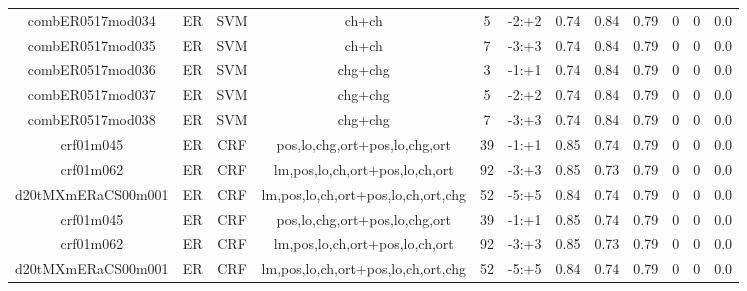 \documentclass[a4paper]{article}
\begin{document}
\begin{landscape}
\begin{center}
\begin{tabular}{ |c|c|c|c|c|c|c|c|c|c|c|c|}
 
 	
 	\small{ combER0517mod034 } & ER & SVM & ch+ch  &  5 &  -2:+2  &  0.74 & 0.84 & 0.79  &  0 & 0 & 0.0 \\
 	

 
 	
 	\small{ combER0517mod035 } & ER & SVM & ch+ch  &  7 &  -3:+3  &  0.74 & 0.84 & 0.79  &  0 & 0 & 0.0 \\
 	

 
 	
 	\small{ combER0517mod036 } & ER & SVM & chg+chg  &  3 &  -1:+1  &  0.74 & 0.84 & 0.79  &  0 & 0 & 0.0 \\
 	

 
 	
 	\small{ combER0517mod037 } & ER & SVM & chg+chg  &  5 &  -2:+2  &  0.74 & 0.84 & 0.79  &  0 & 0 & 0.0 \\
 	

 
 	
 	\small{ combER0517mod038 } & ER & SVM & chg+chg  &  7 &  -3:+3  &  0.74 & 0.84 & 0.79  &  0 & 0 & 0.0 \\
 	

 
 	
 	\small{ crf01m045 } & ER & CRF & pos,lo,chg,ort+pos,lo,chg,ort  &  39 &  -1:+1  &  0.85 & 0.74 & 0.79  &  0 & 0 & 0.0 \\
 	

 
 	
 	\small{ crf01m062 } & ER & CRF & lm,pos,lo,ch,ort+pos,lo,ch,ort  &  92 &  -3:+3  &  0.85 & 0.73 & 0.79  &  0 & 0 & 0.0 \\
 	

 
 	
 	\small{ d20tMXmERaCS00m001 } & ER & CRF & lm,pos,lo,ch,ort+pos,lo,ch,ort,chg  &  52 &  -5:+5  &  0.84 & 0.74 & 0.79  &  0 & 0 & 0.0 \\
 	

 
 	
 	\small{ crf01m045 } & ER & CRF & pos,lo,chg,ort+pos,lo,chg,ort  &  39 &  -1:+1  &  0.85 & 0.74 & 0.79  &  0 & 0 & 0.0 \\
 	

 
 	
 	\small{ crf01m062 } & ER & CRF & lm,pos,lo,ch,ort+pos,lo,ch,ort  &  92 &  -3:+3  &  0.85 & 0.73 & 0.79  &  0 & 0 & 0.0 \\
 	

 
 	
 	\small{ d20tMXmERaCS00m001 } & ER & CRF & lm,pos,lo,ch,ort+pos,lo,ch,ort,chg  &  52 &  -5:+5  &  0.84 & 0.74 & 0.79  &  0 & 0 & 0.0 \\
 	


\end{tabular}
\end{center}
\end{landscape}
\end{document}
